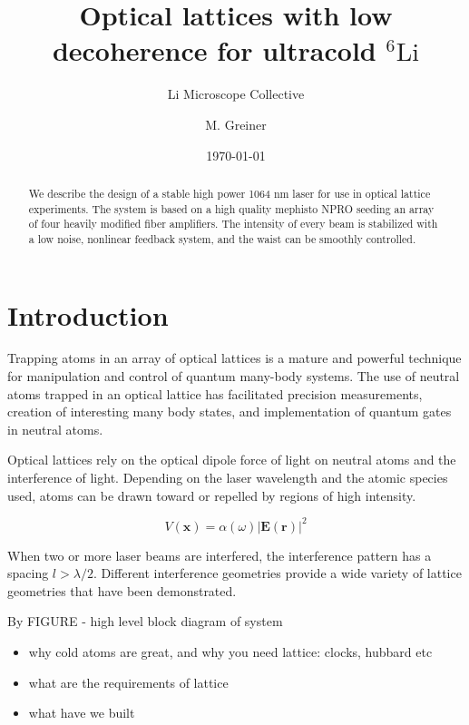 \documentclass[twocolumn,aps,pra,showpacs,preprintnumbers,bibnotes]{revtex4-1}
\newcommand\Isotope[2]{\ensuremath{^{#1}\mathrm{#2}}}
\newcommand\Li{\Isotope{6}{Li}}
\begin{document}
\title{Optical lattices with low decoherence for ultracold \Li{}}


\author{Li Microscope Collective}
\author{M. Greiner}

\date{\today}
\begin{abstract}
We describe the design of a stable high power 1064 nm laser for use in optical lattice experiments. The system is based on a high quality mephisto NPRO seeding an array of four heavily modified fiber amplifiers. The intensity of every beam is stabilized with a low noise, nonlinear feedback system, and the waist can be smoothly controlled. 
\end{abstract}
\maketitle
\section{Introduction}
Trapping atoms in an array of optical lattices is a mature and powerful technique for manipulation and control of quantum many-body systems. The use of neutral atoms trapped in an optical lattice has facilitated precision measurements, creation of interesting many body states, and implementation of quantum gates in neutral atoms.

Optical lattices rely on the optical dipole force of light on neutral atoms and the interference of light. Depending on the laser wavelength and the atomic species used, atoms can be drawn toward or repelled by regions of high intensity. 

\begin{equation}
    V(\pmb{x}) = \alpha(\omega)|\pmb{E}(\pmb{r})|^2
\end{equation}

When two or more laser beams are interfered, the interference pattern has a spacing $l>\lambda/2$. Different interference geometries provide a wide variety of lattice geometries that have been demonstrated.   

By FIGURE - high level block diagram of system
\begin{itemize}
	\item why cold atoms are great, and why you need lattice: clocks, hubbard etc
	\item what are the requirements of lattice
	\item what have we built
\end{itemize}
\end{document}
